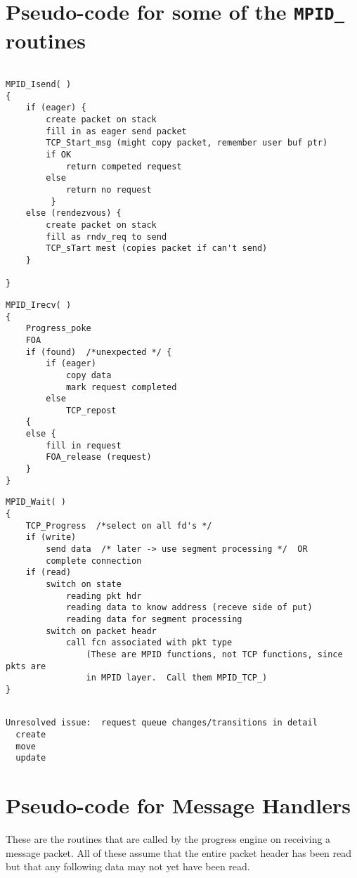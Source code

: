 \documentclass{article}
\def\code#1{\texttt{#1}}
\begin{document}
\section{Pseudo-code for some of the \code{MPID_} routines}

\begin{verbatim}

MPID_Isend( )
{
    if (eager) {
        create packet on stack
        fill in as eager send packet
        TCP_Start_msg (might copy packet, remember user buf ptr)
        if OK
            return competed request
        else        
            return no request 
         }
    else (rendezvous) {
        create packet on stack
        fill as rndv_req to send
        TCP_sTart mest (copies packet if can't send)
    } 

}
\end{verbatim}

\begin{verbatim}
MPID_Irecv( )
{
    Progress_poke
    FOA
    if (found)  /*unexpected */ {
        if (eager)
            copy data
            mark request completed
        else
            TCP_repost
    {
    else {
        fill in request
        FOA_release (request)
    }
}
\end{verbatim}

\begin{verbatim}
MPID_Wait( )
{
    TCP_Progress  /*select on all fd's */
    if (write)
        send data  /* later -> use segment processing */  OR
        complete connection
    if (read)
        switch on state
            reading pkt hdr
            reading data to know address (receve side of put)
            reading data for segment processing
        switch on packet headr
            call fcn associated with pkt type
                (These are MPID functions, not TCP functions, since pkts are
                in MPID layer.  Call them MPID_TCP_) 
}
\end{verbatim}

\begin{verbatim}

Unresolved issue:  request queue changes/transitions in detail
  create
  move
  update
\end{verbatim}


\section{Pseudo-code for Message Handlers}
These are the routines that are called by the progress engine on receiving a
message packet.  All of these assume that the entire packet header has been 
read but that any following data may not yet have been read.
\end{document}

